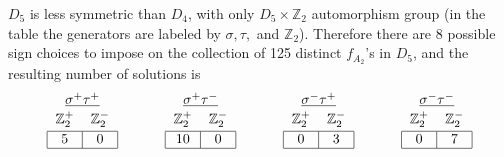 \documentclass[11pt]{article}
\begin{document}
$D_5$ is less symmetric than $D_4$, with only $D_5 \times \mathbb{Z}_2$ automorphism group (in the table the generators are labeled by $\sigma,\tau,$ and $\mathbb{Z}_2$). Therefore there are 8 possible sign choices to impose on the collection of 125 distinct $f_{A_2}$'s in $D_5$, and the resulting number of solutions is
\begin{equation}\label{eq:a2-d5-counts}
\begin{tabular}{| c | c |}
\multicolumn{2}{c}{$\underline{\sigma^+ \tau^+}$} \\[-1em]
\multicolumn{1}{c}{} & \multicolumn{1}{c}{} \\
\multicolumn{1}{c}{$\mathbb{Z}_2^+$} & \multicolumn{1}{c}{$\mathbb{Z}_2^-$} \\[-1em]
\multicolumn{1}{c}{} & \multicolumn{1}{c}{} \\
\hline
5 & 0 \\
\hline
\end{tabular} 
\hspace{1.2cm}
\begin{tabular}{| c | c |}
\multicolumn{2}{c}{$\underline{\sigma^+ \tau^-}$} \\[-1em]
\multicolumn{1}{c}{} & \multicolumn{1}{c}{} \\
\multicolumn{1}{c}{$\mathbb{Z}_2^+$} & \multicolumn{1}{c}{$\mathbb{Z}_2^-$} \\[-1em]
\multicolumn{1}{c}{} & \multicolumn{1}{c}{} \\
\hline
10 & 0 \\
\hline
\end{tabular} 
\hspace{1.2cm}
\begin{tabular}{| c | c |}
\multicolumn{2}{c}{$\underline{\sigma^- \tau^+}$} \\[-1em]
\multicolumn{1}{c}{} & \multicolumn{1}{c}{} \\
\multicolumn{1}{c}{$\mathbb{Z}_2^+$} & \multicolumn{1}{c}{$\mathbb{Z}_2^-$} \\[-1em]
\multicolumn{1}{c}{} & \multicolumn{1}{c}{} \\
\hline
0 & 3 \\
\hline
\end{tabular} 
\hspace{1.2cm}
\begin{tabular}{| c | c |}
\multicolumn{2}{c}{$\underline{\sigma^- \tau^-}$} \\[-1em]
\multicolumn{1}{c}{} & \multicolumn{1}{c}{} \\
\multicolumn{1}{c}{$\mathbb{Z}_2^+$} & \multicolumn{1}{c}{$\mathbb{Z}_2^-$} \\[-1em]
\multicolumn{1}{c}{} & \multicolumn{1}{c}{} \\
\hline
0 & 7 \\
\hline
\end{tabular} 
\end{equation}
\end{document}
